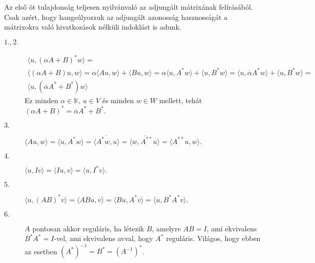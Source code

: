 \documentclass[9pt, a4paper, showtrims]{memoir}
\makeatletter
\renewenvironment{proof}[1][\proofname]
    {\par\pushQED{\qed}%
    \normalfont \topsep6\p@\@plus6\p@\relax
    \trivlist
    \item[\hskip\labelsep
        \itshape
    #1\@addpunct{:}]\ignorespaces}
    {\popQED\endtrivlist\@endpefalse}
\theoremstyle{plain}
\theoremstyle{remark}
\theoremstyle{definition}
\newcommand{\ip}[2]{\langle#1,#2\rangle}
\makeatother
\begin{document}
\begin{proof}
    Az első öt tulajdonság teljesen nyilvánvaló az adjungált mátrixának felírásából.
    Csak azért, hogy hangsúlyozzuk az adjungált azonosság hasznosságát a mátrixokra való hivatkozások nélküli indoklást is adunk.
    \begin{description}
        \item[$1., 2.$ ]
            \begin{multline*}
                \ip{u}{(\alpha A+B)^\ast w}
                =\\
                \ip{\left( \alpha A+B \right)u}{w}
                =
                \alpha\ip{Au}{w}+\ip{Bu}{w}
                =
                \alpha\ip{u}{A^\ast w}+\ip{u}{B^\ast w}
                =
                \ip{u}{\overline{\alpha}A^\ast w}+\ip{u}{B^\ast w}
                =\\
                \ip{u}{\left( \overline{\alpha}A^\ast +B^\ast \right)w}
            \end{multline*}
            Ez minden $\alpha\in\mathbb{K}$, $u\in V$ és minden $w\in W$ mellett, tehát
            \begin{math}
                \left( \alpha A+B \right)^\ast=\overline{\alpha}A^\ast+B^\ast.
            \end{math}
        \item[$3.$]
            \(
                \ip{Au}{w}
                =
                \ip{u}{A^\ast w}
                =
                \overline{
                    \ip{A^\ast w}{u}
                }
                =
                \overline{
                    \ip{w}{A^{\ast\ast} u}
                }
                =
                \ip{A^{\ast\ast} u}{w}.
            \)
        \item[$4.$]
            \(
            \ip{u}{Iv}
            =
            \ip{Iu}{v}
            =
            \ip{u}{I^\ast v}.
            \)
        \item[$5.$]
            \begin{math}
                \ip{u}{\left( AB \right)^\ast v}
                =
                \ip{ABu}{v}
                =
                \ip{Bu}{A^\ast v}
                =
                \ip{u}{B^\ast A^\ast v}.
            \end{math}
        \item[$6.$] $A$ pontosan akkor reguláris, ha létezik $B$, amelyre $AB=I$, ami ekvivalens $B^\ast A^\ast=I$-vel,
            ami ekvivalens avval, hogy $A^\ast$ reguláris.
            Világos, hogy ebben az esetben $\left( A^\ast \right)^{-1}=B^\ast=\left( A^{-1} \right)^\ast$.
            \qedhere
    \end{description}
\end{proof}
\end{document}
